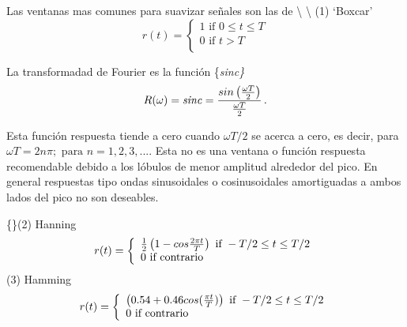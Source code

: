 \documentclass[
]{agujournal2019}
\begin{document}
Las ventanas mas comunes para suavizar señales son las de
\textbackslash{} \textbackslash{} (1) `Boxcar' \begin{equation*}
  r(t)=
  \left\lbrace
  \begin{array}{l}
     1 \text{ if } 0\le t\le T \\
     0 \text{ if } t>T \\
  \end{array}
  \right.
\end{equation*}

\begin{center}
\end{center}

La transformadad de Fourier es la función \{\it sinc\}
\[R(\omega)={\it sinc}=\frac{sin\left(\frac{\omega T}{2}\right)}{\frac{\omega T}{2}}\,.\]

\begin{center}
\end{center}

Esta función respuesta tiende a cero cuando \(\omega T / 2\) se acerca a
cero, es decir, para
\(\omega T=2 n \pi;\,\,\text{para}\,\,n=1,2,3,...\). Esta no es una
ventana o función respuesta recomendable debido a los lóbulos de menor
amplitud alrededor del pico. En general respuestas tipo ondas
sinusoidales o cosinusoidales amortiguadas a ambos lados del pico no son
deseables.

\vspace{0.75cm}

\{\noindent\}(2) Hanning \begin{equation*}
  r(t)=\left\lbrace
  \begin{array}{l}
     \frac{1}{2}\left( 1-cos\frac{2\pi t}{T}\right) \text{ if } -T/2 \le t \le T/2 \\
     0 \text{ if } {\rm contrario} \\
  \end{array}
  \right.
  \end{equation*} (3) Hamming \begin{equation*}
  r(t)=\left\lbrace
  \begin{array}{l}
     \left(0.54  + 0.46 cos(\frac{\pi t}{T}) \right) \text{ if } -T/2 \le t \le T/2 \\
     0 \text{ if } {\rm contrario} \\
  \end{array}
  \right.
  \end{equation*}
\end{document}
